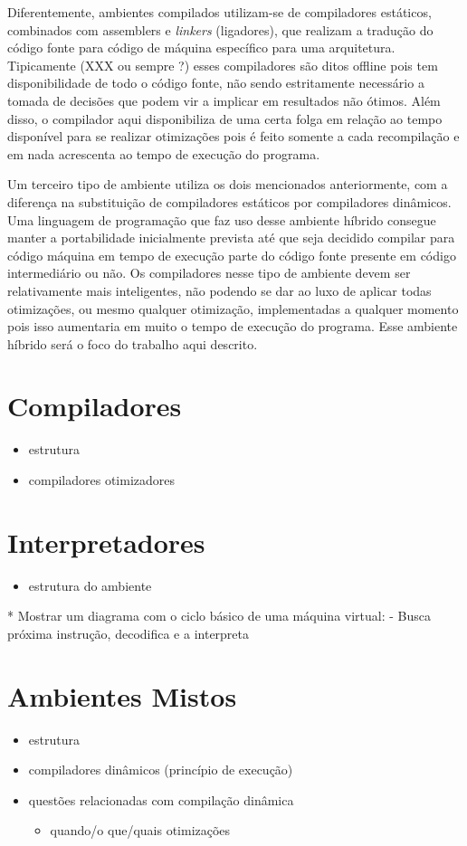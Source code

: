 Diferentemente, ambientes compilados utilizam-se de compiladores
estáticos, combinados com assemblers e \emph{linkers} (ligadores), que
realizam a tradução do código fonte para código de máquina específico
para uma arquitetura. Tipicamente (XXX ou sempre ?) esses compiladores
são ditos offline pois tem disponibilidade de todo o código fonte, não
sendo estritamente necessário a tomada de decisões que podem vir a
implicar em resultados não ótimos. Além disso, o compilador aqui
disponibiliza de uma certa folga em relação ao tempo disponível para
se realizar otimizações pois é feito somente a cada recompilação e em
nada acrescenta ao tempo de execução do programa.

Um terceiro tipo de ambiente utiliza os dois mencionados
anteriormente, com a diferença na substituição de compiladores
estáticos por compiladores dinâmicos. Uma linguagem de programação que
faz uso desse ambiente híbrido consegue manter a
portabilidade inicialmente prevista até que seja decidido compilar para código
máquina em tempo de execução parte do código fonte presente em código
intermediário ou não. Os compiladores nesse
tipo de ambiente devem ser relativamente mais inteligentes, não
podendo se dar ao luxo de aplicar todas otimizações, ou mesmo qualquer
otimização, implementadas a qualquer momento pois isso aumentaria em
muito o tempo de execução do programa. Esse ambiente híbrido será o
foco do trabalho aqui descrito.


\section{Compiladores}
\label{sec:compiladores}

\begin{itemize}
\item estrutura
\item compiladores otimizadores
\end{itemize}


\section{Interpretadores}
\label{sec:interp}

\begin{itemize}
\item estrutura do ambiente
\end{itemize}

* Mostrar um diagrama com o ciclo básico de uma máquina virtual:
  - Busca próxima instrução, decodifica e a interpreta


\section{Ambientes Mistos}
\label{sec:hibrido}

\begin{itemize}
\item estrutura
\item compiladores dinâmicos (princípio de execução)
\item questões relacionadas com compilação dinâmica
\begin{itemize}
\item quando/o que/quais otimizações
\end{itemize}
\end{itemize}
